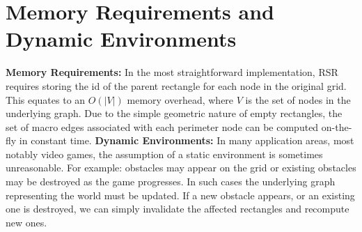 \section{Memory Requirements and Dynamic Environments}
\label{cha::rsr::memory}
\textbf{Memory Requirements: }
In the most straightforward implementation, RSR requires storing the id of the
parent rectangle for each node in the original grid. 
This equates to an $O(|V|)$ memory overhead, where $V$ is the set of nodes
in the underlying graph.
Due to the simple geometric nature of empty rectangles, the set of macro
edges associated with each perimeter node can be computed on-the-fly in
constant time. 
\newline \noindent
\textbf{Dynamic Environments: }
In many application areas, most notably video games, the assumption of a static 
environment is sometimes unreasonable.
For example: obstacles may appear on the grid or existing obstacles may be
destroyed as the game progresses.
In such cases the underlying graph representing the world must be updated.
If a new obstacle appears, or an existing one is destroyed,
we can simply invalidate the affected rectangles and recompute new ones.

